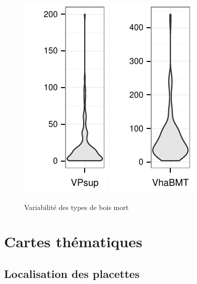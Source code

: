 \documentclass[a4paper]{book}\usepackage[]{graphicx}\usepackage[]{color}
\makeatletter
\def\maxwidth{ %
  \ifdim\Gin@nat@width>\linewidth
    \linewidth
  \else
    \Gin@nat@width
  \fi
}
\newenvironment{knitrout}{}{} %
\makeatother
\begin{document}
\begin{knitrout}
\begin{figure}[H]
{\includegraphics[width=\maxwidth]{Figures/GraphBMT-4} 
\includegraphics[width=\maxwidth]{Figures/GraphBMT-5} 

}

\caption[Variabilité des types de bois mort]{Variabilité des types de bois mort\label{fig:GraphBMT}}
\end{figure}


\end{knitrout}

\section{Cartes thématiques}


\subsection{Localisation des placettes}
\end{document}
